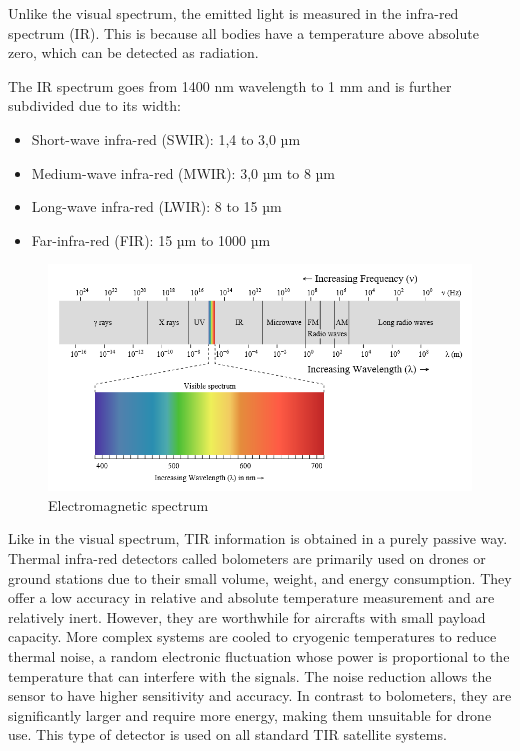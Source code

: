     Unlike the visual spectrum, the emitted light is measured in the infra-red spectrum (IR).
    This is because all bodies have a temperature above absolute zero, which can be detected as radiation.


    The IR spectrum goes from 1400 nm wavelength to 1 mm and is further subdivided due to its width:


    \begin{itemize}
        \item  Short-wave infra-red (SWIR): 1,4 to 3,0 µm
        \item  Medium-wave infra-red (MWIR): 3,0 µm to 8 µm
        \item Long-wave infra-red (LWIR): 8 to 15 µm
        \item Far-infra-red (FIR): 15 µm to 1000 µm
    \end{itemize}

    \begin{figure}[H]
        \centering
        \includegraphics[width=\textwidth]{Includes/1-electromagnetic-spectrum.png}
        \caption{Electromagnetic spectrum}
        \label{fig:1-electromagnetic-spectrum}
    \end{figure}


    
    Like in the visual spectrum, TIR information is obtained in a purely passive way.
    Thermal infra-red detectors called bolometers are primarily used on drones or ground stations due to their small volume, weight, and energy consumption. 
    They offer a low accuracy in relative and absolute temperature measurement and are relatively inert. However, they are worthwhile for aircrafts with small payload capacity.     
    More complex systems are cooled to cryogenic temperatures to reduce thermal noise, a random electronic fluctuation whose power is proportional to the temperature that can interfere with the signals. The noise reduction allows the sensor to have higher sensitivity and accuracy. In contrast to bolometers, they are significantly larger and require more energy, making them unsuitable for drone use. This type of detector is used on all standard TIR satellite systems.

